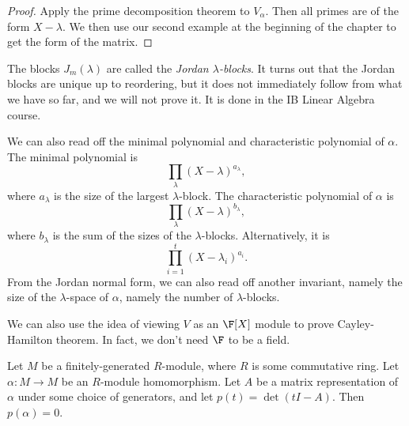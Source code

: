 \documentclass[a4paper]{article}
\begin{document}
\begin{proof}
  Apply the prime decomposition theorem to $V_\alpha$. Then all primes are of the form $X - \lambda$. We then use our second example at the beginning of the chapter to get the form of the matrix.
\end{proof}

The blocks $J_m(\lambda)$ are called the \emph{Jordan $\lambda$-blocks}. It turns out that the Jordan blocks are unique up to reordering, but it does not immediately follow from what we have so far, and we will not prove it. It is done in the IB Linear Algebra course.

We can also read off the minimal polynomial and characteristic polynomial of $\alpha$. The minimal polynomial is
\[
  \prod_{\lambda} (X - \lambda)^{a_\lambda},
\]
where $a_\lambda$ is the size of the largest $\lambda$-block. The characteristic polynomial of $\alpha$ is
\[
  \prod_{\lambda} (X - \lambda)^{b_\lambda},
\]
where $b_\lambda$ is the sum of the sizes of the $\lambda$-blocks. Alternatively, it is
\[
  \prod_{i = 1}^t (X - \lambda_i)^{a_i}.
\]
From the Jordan normal form, we can also read off another invariant, namely the size of the $\lambda$-space of $\alpha$, namely the number of $\lambda$-blocks.

We can also use the idea of viewing $V$ as an $\F[X]$ module to prove Cayley-Hamilton theorem. In fact, we don't need $\F$ to be a field.
\begin{thm}
  Let $M$ be a finitely-generated $R$-module, where $R$ is some commutative ring. Let $\alpha: M \to M$ be an $R$-module homomorphism. Let $A$ be a matrix representation of $\alpha$ under some choice of generators, and let $p(t) = \det(tI - A)$. Then $p(\alpha) = 0$.
\end{thm}
\end{document}
